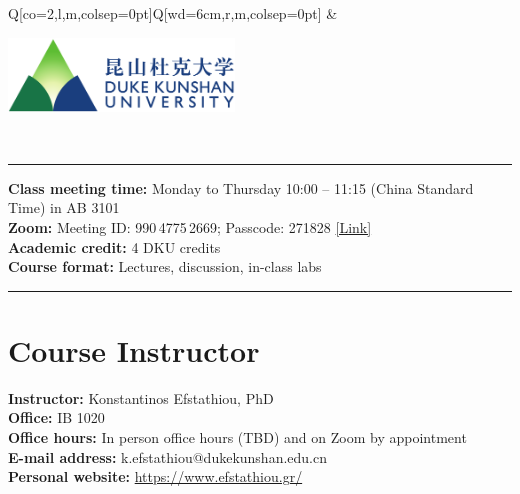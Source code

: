 \documentclass[11pt]{article}
\begin{document}

\begin{tblr}{Q[co=2,l,m,colsep=0pt]Q[wd=6cm,r,m,colsep=0pt]}
& \parbox{6cm}{\includegraphics[width=6cm]{dku-logo}}
\\[6pt]
\hline[1pt,dku-blue,abovespace=12pt]
\end{tblr}

\vspace{1em}

\textcolor{dku-blue}{\rule{\textwidth}{1pt}}

\textbf{Class meeting time:} Monday to Thursday 10:00 -- 11:15 (China Standard Time) in AB 3101 \\
\textbf{Zoom:} Meeting ID: 990\,4775\,2669; Passcode: 271828 \href{https://duke.zoom.us/j/99047752669?pwd=VkptQTNXSmhKYy9hNWh1Z2oxRENsdz09}{[Link]} \\
\textbf{Academic credit:} 4 DKU credits \\
\textbf{Course format:} Lectures, discussion, in-class labs

\vspace{-1em}\textcolor{dku-blue}{\rule{\textwidth}{1pt}}


\section{Course Instructor}

\textbf{Instructor:} Konstantinos Efstathiou, PhD \\
\textbf{Office:} IB 1020 \\
\textbf{Office hours:} In person office hours (TBD) and on Zoom by appointment \\
\textbf{E-mail address:} k.efstathiou@dukekunshan.edu.cn \\
\textbf{Personal website:} \url{https://www.efstathiou.gr/}
\end{document}
